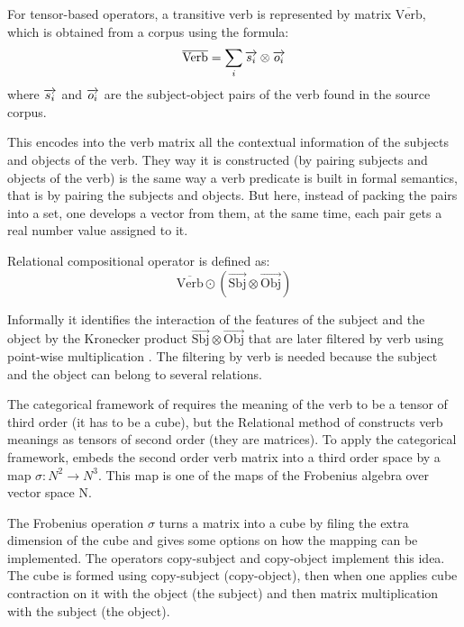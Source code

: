 For tensor-based operators, a transitive verb is represented by matrix $\overline{\text{Verb}}$, which is obtained from a corpus using the formula:
$$
\overline{\text{Verb}} = \sum_i\overrightarrow{s_i} \otimes \overrightarrow{o_i}
$$
where $\overrightarrow{s_i}$ and $\overrightarrow{o_i}$ are the subject-object pairs of the verb found in the source corpus.

This encodes into the verb matrix all the contextual information of the subjects and objects of the verb. They way it is constructed (by pairing subjects and objects of the verb) is the same way a verb predicate is built in formal semantics, that is by pairing the subjects and objects. But here, instead of packing the pairs into a set, one develops a vector from them, at the same time, each pair gets a real number value assigned to it. 

Relational compositional operator is defined as:
\begin{equation*}
  \overline{\text{Verb}} \odot (\overrightarrow{\text{Sbj}} \otimes \overrightarrow{\text{Obj}})
\end{equation*}

Informally it identifies the interaction of the features of the subject and the object by the Kronecker product $\overrightarrow{\text{Sbj}} \otimes \overrightarrow{\text{Obj}}$ that are later filtered by verb using point-wise multiplication \cite{Grefenstette:2011:ESC:2145432.2145580}. The filtering by verb is needed because the subject and the object can belong to several relations.

The categorical framework of  requires the meaning of the verb to be a tensor of third order (it has to be a cube), but the Relational method of  constructs verb meanings as tensors of second order (they are matrices). To apply the categorical framework,  embeds the second order verb matrix into a third order space by a map $\sigma: N^2 \to N^3$. This map is one of the maps of the Frobenius algebra over vector space N.

The Frobenius operation $\sigma$ turns a matrix into a cube by filing the extra dimension of the cube and gives some options on how the mapping can be implemented. The operators copy-subject and copy-object \cite{kartsaklis-sadrzadeh-pulman:2012:POSTERS} implement this idea. The cube is formed using copy-subject (copy-object), then when one applies cube contraction on it with the object (the subject) and then matrix multiplication with the subject (the object).

